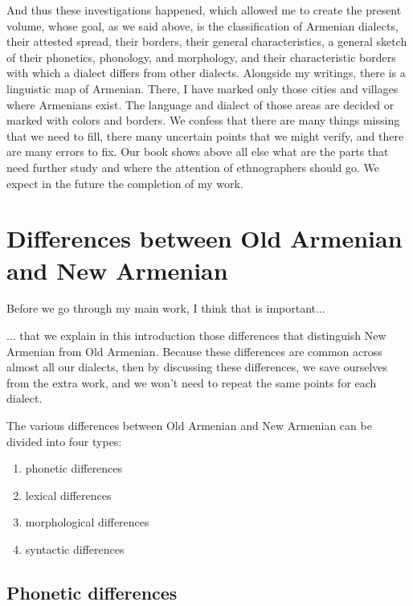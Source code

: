 And thus these investigations happened, which allowed me to create the present volume, whose goal, as we said above, is the classification of Armenian dialects, their attested spread, their borders, their general characteristics, a general sketch of their phonetics, phonology, and morphology, and their characteristic borders with which a dialect differs from other dialects. Alongside my writings, there is a linguistic map of Armenian. There, I have marked only those cities and villages where Armenians exist. The language and dialect of those areas are decided or marked with colors and borders. We confess that there are many things missing that we need to fill, there many uncertain points that we might verify, and there are many errors to fix. Our book shows above all else what are the parts that need further study and where the attention of ethnographers should go. We expect in the future the completion of my work. 


\section{Differences between Old Armenian and New Armenian}

Before we go through my main work, I think that is important... 



\begin{adjarianpage}\label{page:15}\end{adjarianpage}%

... that we explain in this introduction those differences that distinguish New Armenian from Old Armenian. Because these differences are common across almost all our dialects, then by discussing these differences, we save ourselves from the extra work, and we won't need to repeat the same points for each dialect. 


The various differences between Old Armenian and New Armenian can be divided into four types: 
\begin{enumerate}
	\item phonetic differences
	\item lexical differences 
	\item morphological differences
	\item syntactic differences
\end{enumerate}


\subsection{Phonetic differences}\label{sec:IntroAdjarian:Differences:Phonetic}


